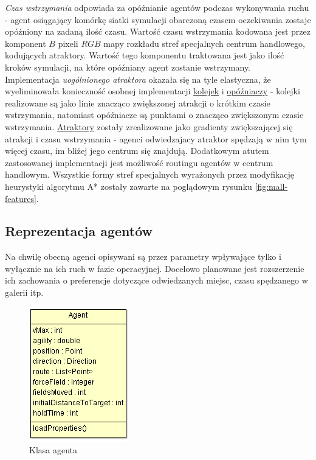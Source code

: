 \documentclass[a4paper, 12pt]{article}
\begin{document}
        \emph{Czas wstrzymania} odpowiada za opóźnianie agentów podczas wykonywania ruchu - agent osiągający komórkę siatki symulacji obarczoną czasem oczekiwania zostaje opóźniony na zadaną ilość czasu. Wartość czasu wstrzymania kodowana jest przez komponent $B$ pixeli $RGB$ mapy rozkładu stref specjalnych centrum handlowego, kodujących atraktory. Wartość tego komponentu traktowana jest jako ilość kroków symulacji, na które opóźniany agent zostanie wstrzymany. \\

Implementacja \emph{uogólnionego atraktora} okazała się na tyle elastyczna, że wyeliminowała konieczność osobnej implementacji \hyperref[sec:queues]{kolejek} i \hyperref[sec:holders]{opóźniaczy} - kolejki realizowane są jako linie znacząco zwiększonej atrakcji o krótkim czasie wstrzymania, natomiast opóźniacze są punktami o znacząco zwiększonym czasie wstrzymania. \hyperref[sec:attractors]{Atraktory} zostały zrealizowane jako gradienty zwiększającej się atrakcji i czasu wstrzymania - agenci odwiedzajacy atraktor spędzają w nim tym więcej czasu, im bliżej jego centrum się znajdują. Dodatkowym atutem zastosowanej implementacji jest możliwość routingu agentów w centrum handlowym. Wszystkie formy stref specjalnych wyrażonych przez modyfikację heurystyki algorytmu A* zostały zawarte na poglądowym rysunku \ref{fig:mall-features}.

        \subsection{Reprezentacja agentów}
        \label{sec:actor-impl}

        Na chwilę obecną agenci opisywani są przez parametry wpływające tylko i wyłącznie na ich ruch w fazie operacyjnej. Docelowo planowane jest rozszerzenie ich zachowania o preferencje dotyczące odwiedzanych miejsc, czasu spędzanego w galerii itp.

    \begin{figure}[H]
        \centering
        \includegraphics[scale=0.75]{./img/agent.png}
        \caption{Klasa agenta}
        \label{fig:agent}
    \end{figure}
\end{document}
